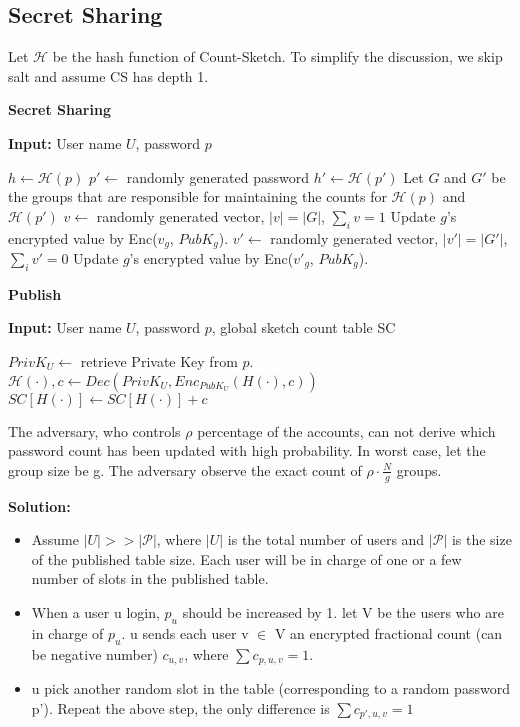 \documentclass[]{article}
\begin{document}
\subsection{Secret Sharing}
Let $\mathcal{H}$ be the hash function of Count-Sketch. To simplify the discussion, we skip salt and assume CS has depth 1.
\begin{algorithm}[!htb]
	\caption{\textbf{Secret Sharing}}
	\textbf{Input: } User name $U$, password $p$
	\begin{algorithmic}[1]
		\State $h \leftarrow \mathcal{H}(p)$
		\State $p' \leftarrow $ randomly generated password
		\State $h' \leftarrow \mathcal{H}(p')$ 
		\State Let $G$ and $G'$ be the groups that are responsible for maintaining the counts for $\mathcal{H}(p)$ and $\mathcal{H}(p')$
		\State $ v \leftarrow$ randomly generated vector, $|v| = |G|$, $\sum_i v = 1$
			\State Update $g$'s encrypted value by Enc($v_g$, $PubK_g$).
		\EndFor
		\State $ v' \leftarrow$ randomly generated vector, $|v'| = |G'|$, $\sum_i v' = 0$
			\State Update $g$'s encrypted value by Enc($v'_g$, $PubK_g$).
		\EndFor
    	\EndFunction
	\end{algorithmic}
\end{algorithm}

\begin{algorithm}[!htb]
	\caption{\textbf{Publish}}
	\textbf{Input: } User name $U$, password $p$, global sketch count table SC
	\begin{algorithmic}[1]
		\State $PrivK_U \leftarrow$ retrieve Private Key from $p$.
		\State $\mathcal{H(\cdot)}, c \leftarrow Dec(PrivK_U, Enc_{PubK_{U}}(H(\cdot),c))$
		\State $SC[H(\cdot)] \leftarrow  SC[H(\cdot)]  + c$ 
    	\EndFunction
	\end{algorithmic}
\end{algorithm}

The adversary, who controls $\rho$ percentage of the accounts, can not derive which password count has been updated with high probability. In worst case, let the group size be g. The adversary observe the exact count of $\rho\cdot\frac{N}{g}$ groups. 


\textbf{Solution:}
\begin{itemize}
	\item Assume $|U| >> |\mathcal{P}|$, where $|U|$ is the total number of users and $|\mathcal{P}|$ is the size of the published table size. Each user will be in charge of one or a few number of slots in the published table.
	\item When a user u login, $p_u$ should be increased by 1. let V be the users who are in charge of $p_u$. u sends each user v $\in$ V an encrypted fractional count (can be negative number) $c_{u,v}$, where $\sum c_{p ,u,v}  = 1$. 
	\item u pick another random slot in the table (corresponding to a random password p'). Repeat the above step, the only difference is $\sum c_{p',u,v}  = 1$
\end{itemize}
\end{document}
